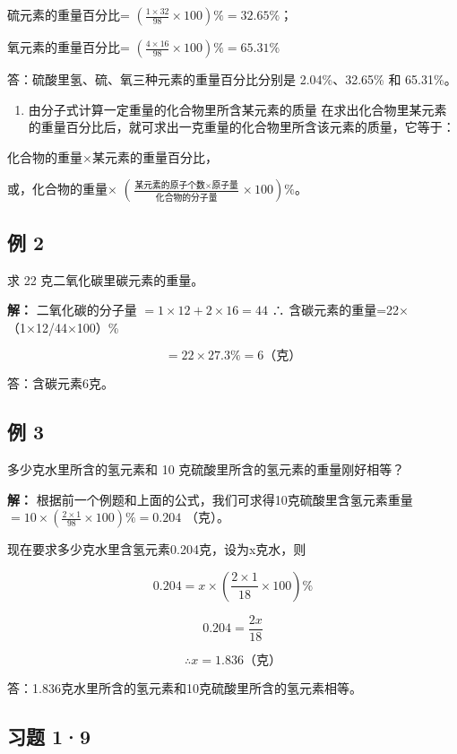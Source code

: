 硫元素的重量百分比=
\(\left(\frac{1\times32}{98}\times100\right)\%=32.65\%\)；

氧元素的重量百分比=
\(\left(\frac{4\times16}{98}\times100\right)\%=65.31\%\)

答：硫酸里氢、硫、氧三种元素的重量百分比分别是 2.04\%、32.65\% 和
65.31\%。

\begin{enumerate}[start=3]
\item
  由分子式计算一定重量的化合物里所含某元素的质量
  在求出化合物里某元素的重量百分比后，就可求出一克重量的化合物里所含该元素的质量，它等于：
\end{enumerate}

化合物的重量×某元素的重量百分比，

或，化合物的重量×
\(\left(\frac{\text{某元素的原子个数}\times\text{原子量}}{\text{化合物的分子量}}\times100\right)\%\)。

\subsection{例 2}

求 22 克二氧化碳里碳元素的重量。

\textbf{解：} 二氧化碳的分子量 \(= 1 \times 12 + 2 \times 16 = 44\) ∴
含碳元素的重量=22×（1×12/44×100）\%

\[
=22\times27.3\%=6\text{（克）}
\]

答：含碳元素6克。

\subsection{例 3}

多少克水里所含的氢元素和 10 克硫酸里所含的氢元素的重量刚好相等？

\textbf{解：}
根据前一个例题和上面的公式，我们可求得10克硫酸里含氢元素重量
\(= 10 \times \left(\frac{2 \times 1}{98} \times 100\right)\% = 0.204\)
（克）。

现在要求多少克水里含氢元素0.204克，设为x克水，则

\[
0.204=x\times\left(\frac{2\times1}{18}\times100\right)\%
\]

\[
0.204=\frac{2x}{18}
\]

\[
\therefore x=1.836\text{（克）}
\]

答：1.836克水里所含的氢元素和10克硫酸里所含的氢元素相等。

\subsection{习题 1·9}

